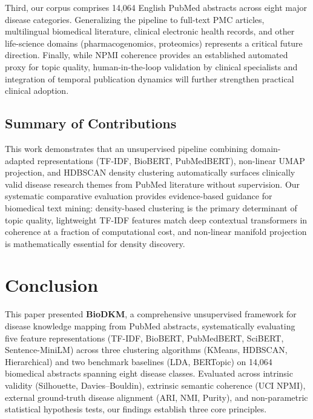 \documentclass[a4paper,fleqn]{cas-dc}
\begin{document}
Third, our corpus comprises 14,064 English PubMed abstracts across eight major disease categories. Generalizing the pipeline to full-text PMC articles, multilingual biomedical literature, clinical electronic health records, and other life-science domains (pharmacogenomics, proteomics) represents a critical future direction. Finally, while NPMI coherence provides an established automated proxy for topic quality, human-in-the-loop validation by clinical specialists and integration of temporal publication dynamics will further strengthen practical clinical adoption.

\subsection{Summary of Contributions}

This work demonstrates that an unsupervised pipeline combining domain-adapted representations (TF-IDF, BioBERT, PubMedBERT), non-linear UMAP projection, and HDBSCAN density clustering automatically surfaces clinically valid disease research themes from PubMed literature without supervision. Our systematic comparative evaluation provides evidence-based guidance for biomedical text mining: density-based clustering is the primary determinant of topic quality, lightweight TF-IDF features match deep contextual transformers in coherence at a fraction of computational cost, and non-linear manifold projection is mathematically essential for density discovery.

\section{Conclusion}

This paper presented \textbf{BioDKM}, a comprehensive unsupervised framework for disease knowledge mapping from PubMed abstracts, systematically evaluating five feature representations (TF-IDF, BioBERT, PubMedBERT, SciBERT, Sentence-MiniLM) across three clustering algorithms (KMeans, HDBSCAN, Hierarchical) and two benchmark baselines (LDA, BERTopic) on 14,064 biomedical abstracts spanning eight disease classes. Evaluated across intrinsic validity (Silhouette, Davies--Bouldin), extrinsic semantic coherence (UCI NPMI), external ground-truth disease alignment (ARI, NMI, Purity), and non-parametric statistical hypothesis tests, our findings establish three core principles.
\end{document}
